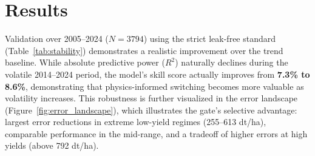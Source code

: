 \section{Results}
Validation over 2005--2024 ($N=3794$) using the strict leak-free standard (Table~\ref{tab:stability}) demonstrates a realistic improvement over the trend baseline. While absolute predictive power ($R^2$) naturally declines during the volatile 2014--2024 period, the model's skill score actually improves from \textbf{7.3\% to 8.6\%}, demonstrating that physics-informed switching becomes more valuable as volatility increases. This robustness is further visualized in the error landscape (Figure~\ref{fig:error_landscape}), which illustrates the gate's selective advantage: largest error reductions in extreme low-yield regimes (255--613 dt/ha), comparable performance in the mid-range, and a tradeoff of higher errors at high yields (above 792 dt/ha).

\begin{table}[t]
\centering
\caption{Long-Term Stability (2005--2024) ($N=3794$)}
\label{tab:stability}
\end{table}

\begin{table}[t]
\centering
\caption{Recent Volatility (2014--2024) ($N=1782$)}
\label{tab:volatility}
\end{table}

